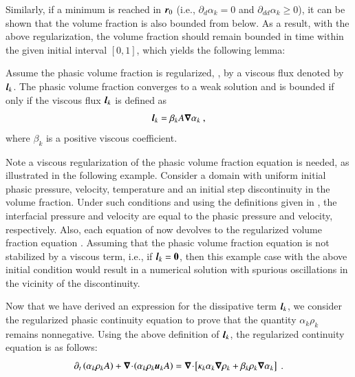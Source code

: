 Similarly, if a minimum is reached in $\boldsymbol r_0$ (i.e., $\partial_d \alpha_k = 0$ and $\partial_{dd} \alpha_k \geq 0$),
it can be shown that the volume fraction is also bounded from below. As a result, with the above regularization, the volume fraction
should remain bounded in time within the given initial interval $[0, 1]$, which yields the following lemma:
%
\begin{lemma}\label{lmm:lemma-2}
Assume the phasic volume fraction is regularized, , by a viscous flux denoted by $\boldsymbol l_k$. The phasic volume fraction converges to a weak solution 
and is bounded if only if the viscous flux  $\boldsymbol l_k$ is defined as 
\begin{equation}
\boldsymbol l_k = \beta_k A \boldsymbol\nabla \alpha_k \ , \nonumber
\end{equation}
where $\beta_k$ is a positive viscous coefficient.
\end{lemma}
%
\begin{my_remark}\label{rmq:rmq_vf_diss_term}
Note a viscous regularization of the phasic volume fraction equation is needed, as illustrated in the following example. Consider a 
domain with uniform initial phasic pressure, velocity, temperature and an initial step discontinuity in the volume fraction. Under such conditions and using the definitions given in , 
the interfacial pressure and velocity are equal to the phasic pressure and velocity, respectively. Also, each equation of  now 
devolves to the regularized volume fraction equation . Assuming that the phasic volume fraction equation is not stabilized by a viscous term, 
i.e., if $\boldsymbol l_k = \boldsymbol0$, then this example case with the above initial condition would result in a numerical solution with spurious oscillations in the vicinity of the discontinuity. 
\end{my_remark}
%
Now that we have derived an expression for the dissipative term $\boldsymbol l_k$, we consider the regularized phasic continuity equation to prove that the quantity 
$\alpha_k \rho_k$ remains nonnegative. Using the above definition of $\boldsymbol l_k$, the regularized continuity equation is as follows:
%
\begin{equation}\label{eq:reg-mass-equ-final}
\partial_t \left( \alpha_k \rho_k A \right) + \boldsymbol\nabla\! \cdot \! \left( \alpha_k \rho_k \boldsymbol u_k A \right) = \boldsymbol\nabla\! \cdot \! \left[ \kappa_k \alpha_k \boldsymbol\nabla \rho_k + \beta_k \rho_k \boldsymbol\nabla \alpha_k \right] \ .
\end{equation}

